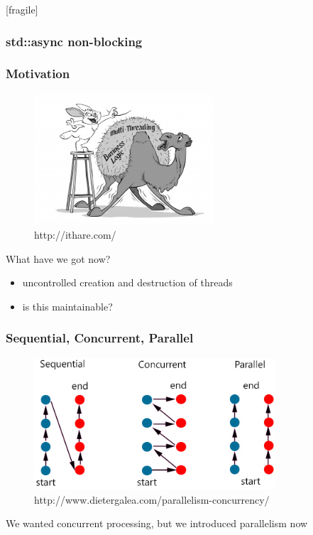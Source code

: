 \begin{frame}{[fragile]}
	\frametitle{std::async non-blocking}
\end{frame}%

\begin{frame}[fragile]
	\frametitle{Motivation}
	\begin{figure}[ht]
		\centering
		\includegraphics[width=0.6\textwidth]{img/multi-threading}\\
		{\tiny http://ithare.com/}\\
	\end{figure}
	\vspace{5mm}
	What have we got now?
	\begin{itemize}
		\item uncontrolled creation and destruction of threads
		\item is this maintainable?
	\end{itemize}
\end{frame}

\begin{frame}[fragile]
	\frametitle{Sequential, Concurrent, Parallel}
	\begin{figure}[ht]
		\centering
		\includegraphics[width=0.8\textwidth]{img/parallel_sequential_concurrent}\\
		{\tiny http://www.dietergalea.com/parallelism-concurrency/}\\
	\end{figure}
	\vspace{5mm}
	We wanted concurrent processing, but we introduced parallelism now
\end{frame}

